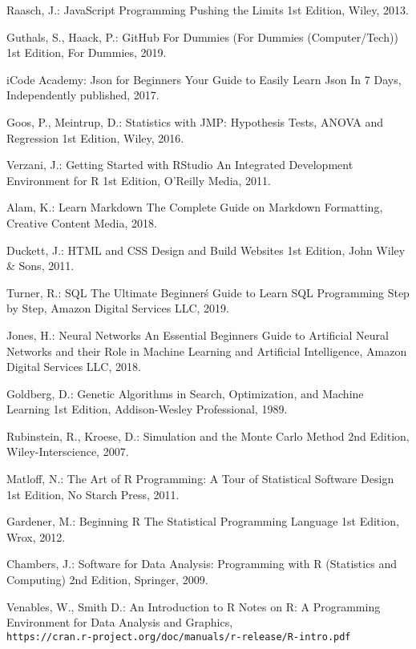 \documentclass[runningheads,14pt,a4paper,openany]{book}
\begin{document}
\begin{thebibliography}{99}
 Raasch, J.: JavaScript Programming Pushing the Limits 1st Edition, Wiley, 2013.

 Guthals, S., Haack, P.: GitHub For Dummies (For Dummies (Computer/Tech)) 1st Edition, For Dummies, 2019.

 iCode Academy: Json for Beginners Your Guide to Easily Learn Json In 7 Days, Independently published, 2017.

 Goos, P., Meintrup, D.: Statistics with JMP: Hypothesis Tests, ANOVA and Regression 1st Edition, Wiley, 2016. 

 Verzani, J.: Getting Started with RStudio An Integrated Development Environment for R 1st Edition,  O'Reilly Media, 2011.

 Alam, K.: Learn Markdown The Complete Guide on Markdown Formatting, Creative Content Media, 2018.

 Duckett, J.: HTML and CSS Design and Build Websites 1st Edition, John Wiley \& Sons, 2011.

 Turner, R.: SQL The Ultimate Beginner\'s Guide to Learn SQL Programming Step by Step, Amazon Digital Services LLC, 2019.

 Jones, H.: Neural Networks An Essential Beginners Guide to Artificial Neural Networks and their Role in Machine Learning and Artificial Intelligence, Amazon Digital Services LLC, 2018.

 Goldberg, D.: Genetic Algorithms in Search, Optimization, and Machine Learning 1st Edition, Addison-Wesley Professional, 1989.

 Rubinstein, R., Kroese, D.: Simulation and the Monte Carlo Method 2nd Edition, Wiley-Interscience, 2007.

 Matloff, N.: The Art of R Programming: A Tour of Statistical Software Design 1st Edition, No Starch Press, 2011.

 Gardener, M.: Beginning R The Statistical Programming Language 1st Edition, Wrox, 2012.

 Chambers, J.: Software for Data Analysis: Programming with R (Statistics and Computing) 2nd Edition, Springer, 2009.

 Venables, W., Smith D.: An Introduction to R Notes on R: A Programming Environment for Data Analysis and Graphics, \\\texttt{https://cran.r-project.org/doc/manuals/r-release/R-intro.pdf}


\end{thebibliography}
\end{document}
